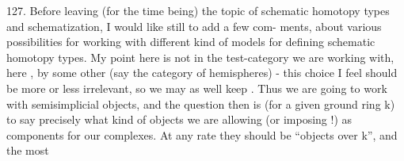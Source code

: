 127. Before leaving (for the time being) the topic of schematic
homotopy types and schematization, I would like still to add a few com-%
 ments, about various possibilities for working with different kind
of models for defining schematic homotopy types. My point here is not
in  the  test-category we are working with, here \hand{$\Delta$} , by some
other (say the category \hand{\unsure{$\bigcirc$}} of  hemispheres) -  this choice I
feel should be more or less irrelevant, so we may as well keep \hand{$\Delta$} .
Thus we are going to work with semisimplicial objects, and the  
question then is (for a given ground ring k) to say  precisely what
kind of objects we are allowing (or imposing !) as components for our
complexes. At any rate they should be ``objects over k'', and the most

